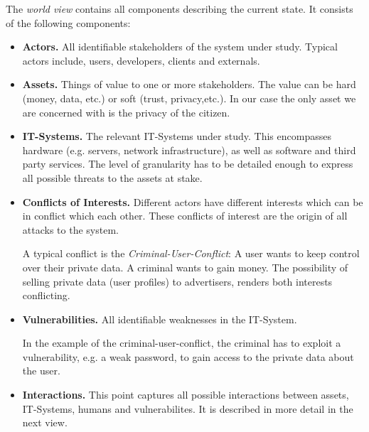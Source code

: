 
The \emph{world view} contains all components describing the current state.
It consists of the following components:
\begin{itemize}
\item \textbf{Actors.}
All identifiable stakeholders of the system under study.
Typical actors include, users, developers, clients and externals.

\item
\textbf{Assets.} Things of value to one or more stakeholders.
The value can be hard (money, data, etc.) or soft (trust, privacy,etc.).
In our case the only asset we are concerned with is the privacy of the citizen.

\item \textbf{IT-Systems.}
The relevant IT-Systems under study. This encompasses hardware (e.g. servers, network infrastructure), as well as software and third party services.
The level of granularity has to be detailed enough to express all possible threats to the assets at stake.

\item \textbf{Conflicts of Interests.}
Different actors have different interests which can be in conflict which each other.
These conflicts of interest are the origin of all attacks to the system.

A typical conflict is the \emph{Criminal-User-Conflict}:
A user wants to keep control over their private data.
A criminal wants to gain money.
The possibility of selling private data (user profiles) to advertisers, renders both interests conflicting.

\item \textbf{Vulnerabilities.}
All identifiable weaknesses in the IT-System.

In the example of the criminal-user-conflict, the criminal has to exploit a vulnerability, e.g. a weak password, to gain access to the private data about the user.

\item \textbf{Interactions.}
This point captures all possible interactions between assets, IT-Systems, humans and vulnerabilites.
It is described in more detail in the next view.
\end{itemize}




